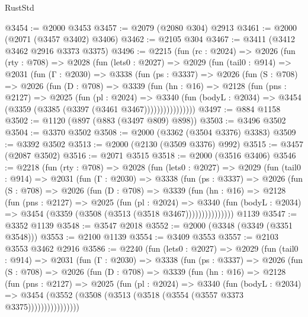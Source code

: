 \begin{lexlean}{RustStd}
\begin{coremodule}
@3454 := @2000 @3453
@3457 := @2079 (@2080 @304) @2913
@3461 := @2000 (@2071 (@3457 @3402) @3406)
@3462 := @2105 @304
@3467 := @3411 (@3412 @3462 @2916 @3373 @3375)
@3496 := @2215
    (fun (rc : @2024) =>
    @2026
      (fun (rty : @708) =>
      @2028
        (fun (lets0 : @2027) =>
        @2029
          (fun (tail0 : @914) =>
          @2031
            (fun (Γ : @2030) =>
            @3338
              (fun (ps : @3337) =>
              @2026
                (fun (S : @708) =>
                @2026
                  (fun (D : @708) =>
                  @3339
                    (fun (hn : @16) =>
                    @2128
                      (fun (pns : @2127) =>
                      @2025
                        (fun (pl : @2024) =>
                        @3340
                          (fun (bodyL : @2034) =>
                          @3454 (@3359 (@3385 (@3397 (@3461 @3467))))))))))))))))
@3497 := @884 @1158
@3502 := @1120 (@897 (@883 (@3497 @809) @898))
@3503 := @3496 @3502
@3504 := @3370 @3502
@3508 := @2000 (@3362 (@3504 @3376) @3383)
@3509 := @3392 @3502
@3513 := @2000 (@2130 (@3509 @3376) @992)
@3515 := @3457 (@2087 @3502)
@3516 := @2071 @3515
@3518 := @2000 (@3516 @3406)
@3546 := @2218
    (fun (rty : @708) =>
    @2028
      (fun (lets0 : @2027) =>
      @2029
        (fun (tail0 : @914) =>
        @2031
          (fun (Γ : @2030) =>
          @3338
            (fun (ps : @3337) =>
            @2026
              (fun (S : @708) =>
              @2026
                (fun (D : @708) =>
                @3339
                  (fun (hn : @16) =>
                  @2128
                    (fun (pns : @2127) =>
                    @2025
                      (fun (pl : @2024) =>
                      @3340
                        (fun (bodyL : @2034) =>
                        @3454 (@3359 (@3508 (@3513 (@3518 @3467)))))))))))))))
    @1139
@3547 := @3352 @1139
@3548 := @3547 @2018
@3552 := @2000 (@3348 (@3349 (@3351 @3548)))
@3553 := @2100 @1139
@3554 := @3409 @3553
@3557 := @2103 @3553 @3462 @2916
@3586 := @2240
    (fun (lets0 : @2027) =>
    @2029
      (fun (tail0 : @914) =>
      @2031
        (fun (Γ : @2030) =>
        @3338
          (fun (ps : @3337) =>
          @2026
            (fun (S : @708) =>
            @2026
              (fun (D : @708) =>
              @3339
                (fun (hn : @16) =>
                @2128
                  (fun (pns : @2127) =>
                  @2025
                    (fun (pl : @2024) =>
                    @3340
                      (fun (bodyL : @2034) =>
                      @3454 (@3552 (@3508 (@3513 (@3518 (@3554 (@3557 @3373 @3375))))))))))))))))

\end{coremodule}
\end{lexlean}
